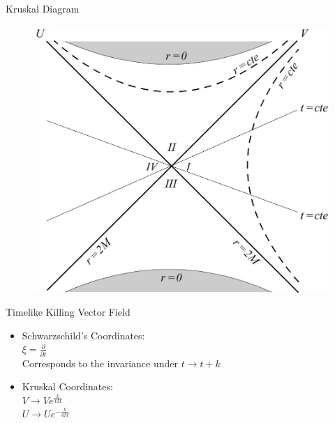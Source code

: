 \documentclass{beamer}
\begin{document}
        \begin{frame}{Kruskal Diagram}
        	\begin{center}
				\begin{figure}
				\includegraphics[scale=0.24] {fig5.jpg}
				\end{figure}
			\end{center}	
        \end{frame}
    
        \begin{frame}{Timelike Killing Vector Field}
			\begin{itemize}
			\item Schwarzschild's Coordinates:\\
            	$\xi = \frac{\partial}{\partial t}$\\
            	\pause
                Corresponds to the invariance under $t\longrightarrow t + k$
                \pause
            \bigskip
            
            \item Kruskal Coordinates: \\
            $ V \longrightarrow  V e^{\frac{k}{4M}} $ \\
			$ U \longrightarrow  U e^{-\frac{k}{4M}}$
			\end{itemize}
        \end{frame}
        
\end{document}

